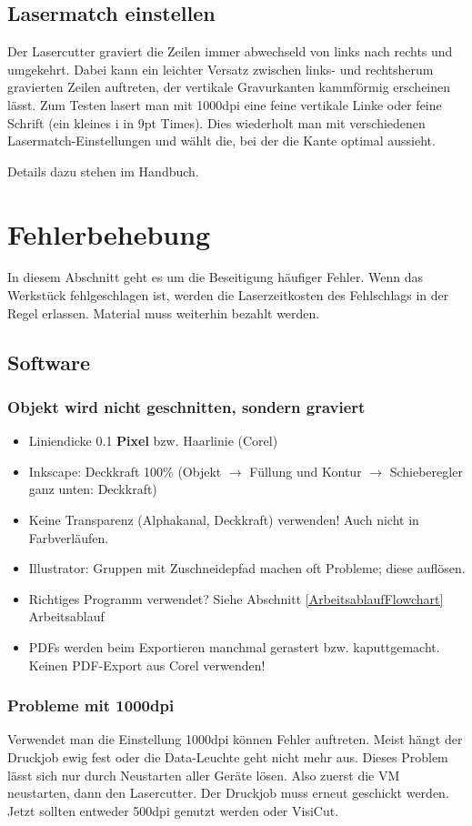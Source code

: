 \documentclass{\basedir/fablab-document}
\begin{document}
\subsection{Lasermatch einstellen}
Der Lasercutter graviert die Zeilen immer abwechseld von links nach rechts und umgekehrt. Dabei kann ein leichter Versatz zwischen links- und rechtsherum gravierten Zeilen auftreten, der vertikale Gravurkanten kammförmig erscheinen lässt. Zum Testen lasert man mit 1000dpi eine feine vertikale Linke oder feine Schrift (ein kleines i in 9pt Times). Dies wiederholt man mit verschiedenen Lasermatch-Einstellungen und wählt die, bei der die Kante optimal aussieht.

Details dazu stehen im Handbuch.

\section{Fehlerbehebung}
In diesem Abschnitt geht es um die Beseitigung häufiger Fehler. Wenn das Werkstück fehlgeschlagen ist, werden die Laserzeitkosten des Fehlschlags in der Regel erlassen. Material muss weiterhin bezahlt werden.

\subsection{Software}
\subsubsection{Objekt wird nicht geschnitten, sondern graviert}
\begin{itemize}
 \item Liniendicke 0.1 \textbf{Pixel} bzw. Haarlinie (Corel)
 \item Inkscape: Deckkraft 100\% (Objekt $\rightarrow$ Füllung und Kontur $\rightarrow$ Schieberegler ganz unten: Deckkraft)
 \item Keine Transparenz (Alphakanal, Deckkraft) verwenden! Auch nicht in Farbverläufen.
 \item Illustrator: Gruppen mit Zuschneidepfad machen oft Probleme; diese auflösen.
 \item Richtiges Programm verwendet? Siehe Abschnitt \ref{ArbeitsablaufFlowchart} Arbeitsablauf
 \item PDFs werden beim Exportieren manchmal gerastert bzw. kaputtgemacht. Keinen PDF-Export aus Corel verwenden!
\end{itemize}


\subsubsection{Probleme mit 1000dpi}
Verwendet man die Einstellung 1000dpi können Fehler auftreten. Meist hängt der Druckjob ewig fest oder die Data-Leuchte geht nicht mehr aus. Dieses Problem lässt sich nur durch Neustarten aller Geräte lösen. Also zuerst die VM neustarten, dann den Lasercutter. Der Druckjob muss erneut geschickt werden. Jetzt sollten entweder 500dpi genutzt werden oder VisiCut.
\end{document}
